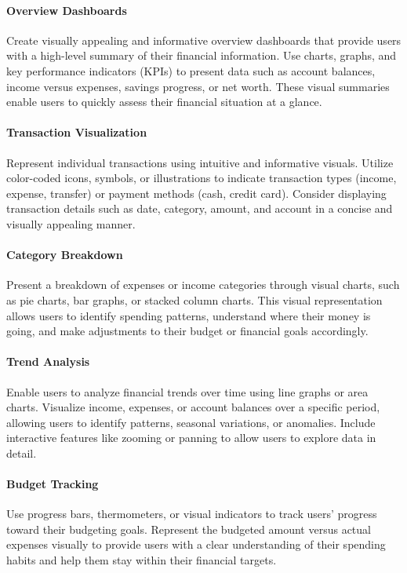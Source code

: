 \paragraph{Overview Dashboards}
Create visually appealing and informative overview dashboards that provide users with a high-level summary of their 
financial information. Use charts, graphs, and key performance indicators (KPIs) to present data such as account 
balances, income versus expenses, savings progress, or net worth. These visual summaries enable users to quickly 
assess their financial situation at a glance.

\paragraph{Transaction Visualization}
Represent individual transactions using intuitive and informative visuals. Utilize color-coded icons, symbols, or 
illustrations to indicate transaction types (income, expense, transfer) or payment methods (cash, credit card). 
Consider displaying transaction details such as date, category, amount, and account in a concise and visually 
appealing manner.

\paragraph{Category Breakdown}
Present a breakdown of expenses or income categories through visual charts, such as pie charts, bar graphs, or 
stacked column charts. This visual representation allows users to identify spending patterns, understand where 
their money is going, and make adjustments to their budget or financial goals accordingly.

\paragraph{Trend Analysis}
Enable users to analyze financial trends over time using line graphs or area charts. Visualize income, expenses, or 
account balances over a specific period, allowing users to identify patterns, seasonal variations, or anomalies. 
Include interactive features like zooming or panning to allow users to explore data in detail.

\paragraph{Budget Tracking}
Use progress bars, thermometers, or visual indicators to track users' progress toward their budgeting goals. Represent 
the budgeted amount versus actual expenses visually to provide users with a clear understanding of their spending 
habits and help them stay within their financial targets.

